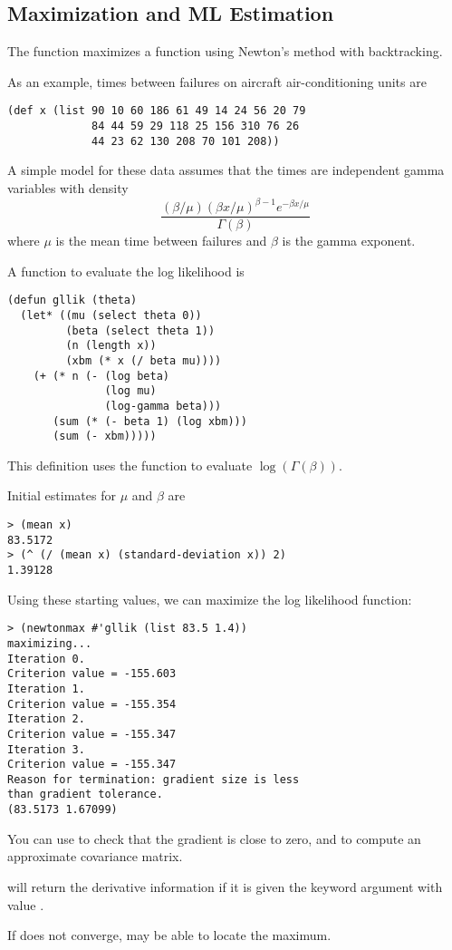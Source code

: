 \begin{slide}{}
\subsection{Maximization and ML Estimation}
The function  maximizes a function using
Newton's method with backtracking.

As an example, times between failures on aircraft air-conditioning
units are
{\Large
\begin{verbatim}
(def x (list 90 10 60 186 61 49 14 24 56 20 79
             84 44 59 29 118 25 156 310 76 26
             44 23 62 130 208 70 101 208))
\end{verbatim}}
A simple model for these data assumes that the times are independent
gamma variables with density
\begin{displaymath}
\frac{(\beta / \mu)(\beta x / \mu)^{\beta - 1} e^{- \beta x / \mu}}
     {\Gamma(\beta)}
\end{displaymath}
where $\mu$ is the mean time between failures and $\beta$ is the gamma
exponent.
\end{slide}

\begin{slide}{}
A function to evaluate the log likelihood is
{\Large
\begin{verbatim}
(defun gllik (theta)
  (let* ((mu (select theta 0))
         (beta (select theta 1))
         (n (length x))
         (xbm (* x (/ beta mu))))
    (+ (* n (- (log beta)
               (log mu)
               (log-gamma beta)))
       (sum (* (- beta 1) (log xbm)))
       (sum (- xbm)))))
\end{verbatim}}
This definition uses the function  to evaluate
$\log(\Gamma(\beta))$.

Initial estimates for $\mu$ and $\beta$ are
{\Large
\begin{verbatim}
> (mean x)
83.5172
> (^ (/ (mean x) (standard-deviation x)) 2)
1.39128
\end{verbatim}}
\end{slide}

\begin{slide}{}
Using these starting values, we can maximize the log likelihood
function:
{\Large
\begin{verbatim}
> (newtonmax #'gllik (list 83.5 1.4))
maximizing...
Iteration 0.
Criterion value = -155.603
Iteration 1.
Criterion value = -155.354
Iteration 2.
Criterion value = -155.347
Iteration 3.
Criterion value = -155.347
Reason for termination: gradient size is less
than gradient tolerance.
(83.5173 1.67099)
\end{verbatim}}

You can use  to check that the gradient is close to
zero, and  to compute an approximate covariance matrix.

 will return the derivative information if it is
given the keyword argument  with value
.

If  does not converge,  may be able
to locate the maximum.
\end{slide}

